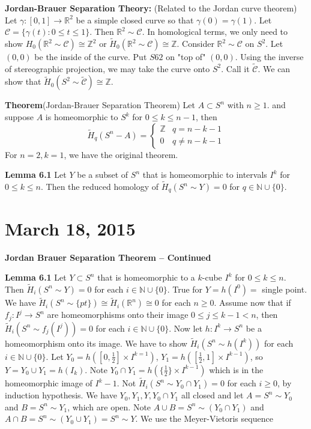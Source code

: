 \documentclass{article}
\begin{document}
\textbf{Jordan-Brauer Separation Theory:} (Related to the Jordan curve theorem) 
Let $\gamma: [0,1] \to \mathbb{R}^2$ 
be a simple closed curve so that 
$\gamma(0) = \gamma(1)$. Let 
$\mathcal{C} = \{ \gamma(t) : 0 \leq t \leq 1 \}$. Then 
$\mathbb{R}^2 \sim \mathcal{C}$. In homological terms, we only need to show 
$H_0(\mathbb{R}^2 \sim \mathcal{C}) \cong \mathbb{Z}^2$ or 
$\tilde{H}_0(\mathbb{R}^2 \sim \mathcal{C}) \cong \mathbb{Z}$. Consider 
$\mathbb{R}^2 \sim \mathcal{C}$ on $S^2$. Let $(0,0)$ be the inside of the curve. Put $S62$ on "top of" $(0,0)$. Using the inverse of stereographic projection, we may take the curve onto
$S^2$. Call it $\tilde{\mathcal{C}}$. We can show that 
$\tilde{H}_0(S^2 \sim \tilde{\mathcal{C}}) \cong \mathbb{Z}$.

\textbf{Theorem}(Jordan-Brauer Separation Theorem) Let $A \subset S^n$ with $n \geq 1$. and suppose $A$ is homeomorphic to $S^k$ for $0 \leq k \leq n-1$, then
\[
\tilde{H}_q(S^n - A) = \begin{cases}
\mathbb{Z} & q = n - k - 1 \\
0 & q \neq n - k - 1
\end{cases}
\]
For $n=2, k=1$, we have the original theorem.

\textbf{Lemma 6.1} Let $Y$ be a subset of $S^n$ that is homeomorphic to intervals $I^k$ for $0 \leq k \leq n$. Then the reduced homology of $\tilde{H}_q (S^n \sim Y) = 0$ for $q \in \mathbb{N} \cup \{ 0 \}$.

\section{March 18, 2015}

\textbf{Jordan Brauer Separation Theorem -- Continued}

\textbf{Lemma 6.1}
Let $Y \subset S^n$ that is homeomorphic to a $k$-cube $I^k$ for $0 \leq k \leq n$. Then $\tilde{H}_i(S^n \sim Y) = 0$ for each $i \in \mathbb{N} \cup \{ 0 \}$. True for $Y = h(I^0)=$ single point. We have $\tilde{H}_i(S^n \sim \{ pt \}) \cong \tilde{H}_i(\mathbb{R}^n) \cong 0$ for each $n \geq 0$. Assume now that if $f_j: I^j \to S^n$ are homeomorphisms onto their image $0 \leq j \leq k-1 < n$, then $\tilde{H}_i(S^n\sim f_j(I^j)) = 0$ for each $i \in \mathbb{N} \cup \{ 0 \}$. Now let $h: I^k \to S^n$ be a homeomorphism onto its image. We have to show $\tilde{H}_i(S^n \sim h(I^k))$ for each $i \in \mathbb{N} \cup \{ 0 \}$. Let $Y_0 = h([0, \frac{1}{2}]\times I^{k=1})$, $Y_1 = h([\frac{1}{2}, 1]\times I^{k-1})$, so $Y = Y_0 \cup Y_1 = h(I_k)$. Note $Y_0 \cap Y_1 = h(\{ \frac{1}{2} \} \times I^{k-1})$ which is in the homeomorphic image of $I^k-1$. Not $\tilde{H}_i(S^n \sim Y_0 \cap Y_1) = 0$ for each $i \geq 0$, by induction hypothesis. We have $Y_0, Y_1, Y, Y_0 \cap Y_1$ all closed and let $A = S^n \sim Y_0$ and $B = S^n \sim Y_1$, which are open. Note $A \cup B = S^n \sim (Y_0 \cap Y_1)$ and $A \cap B = S^n \sim (Y_0 \cup Y_1) = S^n \sim Y$. We use the Meyer-Vietoris sequence
\end{document}
